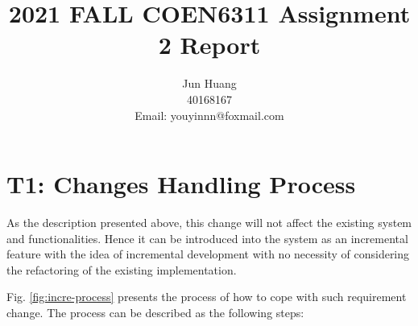 \documentclass[conference]{IEEEtran}
\title{2021 FALL COEN6311 Assignment 2 Report}
\author{Jun Huang\\40168167\\Email: youyinnn@foxmail.com}
\begin{document}
\maketitle

\section{T1: Changes Handling Process}

\textit{}

As the description presented above, this change will not affect the existing system and functionalities.
Hence it can be introduced into the system as an incremental feature with the idea of incremental development
with no necessity of considering the refactoring of the existing implementation.

Fig. \ref{fig:incre-process} presents the process of how to cope with such requirement change.
The process can be described as the following steps:
\end{document}
